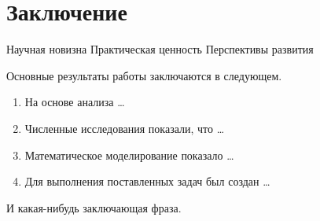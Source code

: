 \chapter*{Заключение}						%

Научная новизна Практическая ценность Перспективы развития

Основные результаты работы заключаются в следующем.
\begin{enumerate}
  \item На основе анализа \ldots
  \item Численные исследования показали, что \ldots
  \item Математическое моделирование показало \ldots
  \item Для выполнения поставленных задач был создан \ldots
\end{enumerate}
И какая-нибудь заключающая фраза.

\clearpage